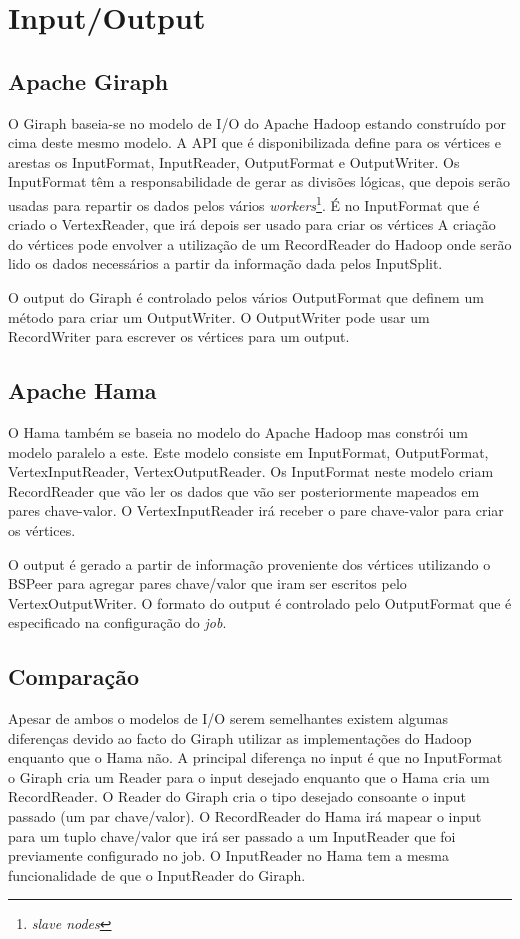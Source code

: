 \newpage
\section*{Input/Output}

\subsection*{Apache Giraph}
O Giraph baseia-se no modelo de I/O do Apache Hadoop estando construído por cima deste mesmo modelo.
A API que é disponibilizada define para os vértices e arestas os InputFormat, InputReader, OutputFormat e OutputWriter.
Os InputFormat têm a responsabilidade de gerar as divisões lógicas, que depois serão usadas para repartir os dados pelos vários
\textit{workers}\footnote{\textit{slave nodes}}. É no InputFormat que é criado o VertexReader, que irá depois ser usado para criar os vértices
A criação do vértices pode envolver a utilização de um RecordReader do Hadoop onde serão lido os dados necessários a partir da informação dada pelos
InputSplit.

O output do Giraph é controlado pelos vários OutputFormat que definem um método para criar um OutputWriter. O OutputWriter pode usar um RecordWriter
para escrever os vértices para um output.

\subsection*{Apache Hama}

O Hama também se baseia no modelo do Apache Hadoop mas constrói um modelo paralelo a este.
Este modelo consiste em InputFormat, OutputFormat, VertexInputReader, VertexOutputReader. Os InputFormat neste modelo criam RecordReader 
que vão ler os dados que vão ser posteriormente mapeados em pares chave-valor. O VertexInputReader irá receber o pare chave-valor para criar os
vértices.

O output é gerado a partir de informação proveniente dos vértices utilizando o BSPeer para agregar pares chave/valor que iram
ser escritos pelo VertexOutputWriter. O formato do output é controlado pelo OutputFormat que é especificado na
configuração do \textit{job}.


\subsection*{Comparação}

Apesar de ambos o modelos de I/O serem semelhantes existem algumas diferenças devido ao facto do Giraph utilizar as implementações 
do Hadoop enquanto que o Hama não. A principal diferença no input é que no InputFormat o Giraph cria um Reader para o input desejado enquanto que 
o Hama cria um RecordReader. O Reader do Giraph cria o tipo desejado consoante o input passado (um par chave/valor). O RecordReader
do Hama irá mapear o input para um tuplo chave/valor que irá ser passado a um InputReader que foi previamente configurado no job. O InputReader
no Hama tem a mesma funcionalidade de que o InputReader do Giraph.